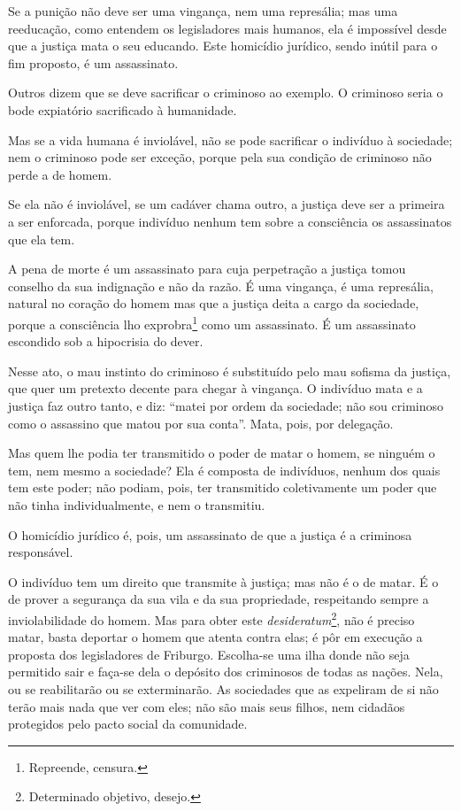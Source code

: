 Se a punição não deve ser uma vingança, nem uma represália; mas uma
reeducação, como entendem os legisladores mais humanos, ela é impossível
desde que a justiça mata o seu educando. Este homicídio jurídico, sendo
inútil para o fim proposto, é um assassinato.

Outros dizem que se deve sacrificar o criminoso ao exemplo. O criminoso
seria o bode expiatório sacrificado à humanidade.

Mas se a vida humana é inviolável, não se pode sacrificar o indivíduo à
sociedade; nem o criminoso pode ser exceção, porque pela sua condição de
criminoso não perde a de homem.

Se ela não é inviolável, se um cadáver chama outro, a justiça deve ser a
primeira a ser enforcada, porque indivíduo nenhum tem sobre a
consciência os assassinatos que ela tem.

A pena de morte é um assassinato para cuja perpetração a justiça tomou
conselho da sua indignação e não da razão. É uma vingança, é uma
represália, natural no coração do homem mas que a justiça deita a cargo
da sociedade, porque a consciência lho exprobra\footnote{Repreende,
  censura.} como um assassinato. É um assassinato escondido sob a
hipocrisia do dever.

Nesse ato, o mau instinto do criminoso é substituído pelo mau sofisma da
justiça, que quer um pretexto decente para chegar à vingança. O
indivíduo mata e a justiça faz outro tanto, e diz: ``matei por ordem da
sociedade; não sou criminoso como o assassino que matou por sua conta''.
Mata, pois, por delegação.

Mas quem lhe podia ter transmitido o poder de matar o homem, se ninguém
o tem, nem mesmo a sociedade? Ela é composta de indivíduos, nenhum dos
quais tem este poder; não podiam, pois, ter transmitido coletivamente um
poder que não tinha individualmente, e nem o transmitiu.

O homicídio jurídico é, pois, um assassinato de que a justiça é a
criminosa responsável.

O indivíduo tem um direito que transmite à justiça; mas não é o de
matar. É o de prover a segurança da sua vila e da sua propriedade,
respeitando sempre a inviolabilidade do homem. Mas para obter este
\emph{desideratum}\footnote{Determinado objetivo, desejo.}, não é
preciso matar, basta deportar o homem que atenta contra elas; é pôr em
execução a proposta dos legisladores de Friburgo. Escolha-se uma ilha
donde não seja permitido sair e faça-se dela o depósito dos criminosos
de todas as nações. Nela, ou se reabilitarão ou se exterminarão. As
sociedades que as expeliram de si não terão mais nada que ver com eles;
não são mais seus filhos, nem cidadãos protegidos pelo pacto social da
comunidade.


